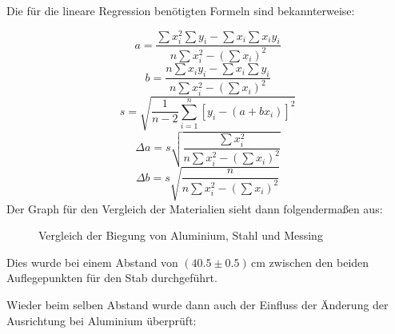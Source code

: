 \documentclass[11pt,a4paper]{article}
\begin{document}
Die f\"ur die lineare Regression ben\"otigten Formeln sind bekannterweise:

\begin{equation}
a=\frac{\sum x_i^2\sum y_i-\sum x_i\sum x_iy_i}{n\sum x_i^2-(\sum x_i)^2}
\end{equation}
\begin{equation}
b=\frac{n\sum x_iy_i-\sum x_i\sum y_i}{n\sum x_i^2-(\sum x_i)^2}
\end{equation}
\begin{equation}
s=\sqrt{\frac{1}{n-2}\sum^n_{i=1}[y_i-(a+bx_i)]^2}
\end{equation}
\begin{equation}
\Delta a=s\sqrt{\frac{\sum x_i^2}{n\sum x_i^2-(\sum x_i)^2}}
\end{equation}
\begin{equation}
\Delta b=s\sqrt{\frac{n}{n\sum x_i^2-(\sum x_i)^2}}
\end{equation}
\pagebreak
Der Graph f\"ur den Vergleich der Materialien sieht dann folgenderma\ss en aus:

\begin{figure}[h]
\centering
{}
\renewcommand\thefigure{D1}
\caption[Vergleich der Biegung von Aluminium, Stahl und Messing]{Vergleich der Biegung von Aluminium, Stahl und Messing}
\label{Abb:1}
\end{figure}

Dies wurde bei einem Abstand von $(40.5\pm0.5)$\,cm zwischen den beiden Auflegepunkten f\"ur den Stab durchgef\"uhrt.

\pagebreak

Wieder beim selben Abstand wurde dann auch der Einfluss der \"Anderung der Ausrichtung bei Aluminium \"uberpr\"uft:
\end{document}
